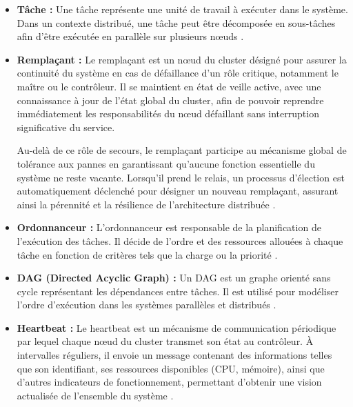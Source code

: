\documentclass[12pt,a4paper]{report}
\theoremstyle{definition}
\begin{document}
\begin{itemize}
Au-delà de la simple surveillance, le contrôleur joue un rôle clé dans la stabilité du système. Il déclenche les mécanismes de gestion des pannes, tels que la mise hors service d’un nœud défaillant ou l’initiation d’un processus d’élection pour remplacer un rôle critique \cite{bully}. Il garantit ainsi la cohérence, la fiabilité et la continuité du fonctionnement global du cluster.


    \item[$\bullet$] \textbf{Tâche :} Une tâche représente une unité de travail à exécuter dans le système. Dans un contexte distribué, une tâche peut être décomposée en sous-tâches afin d’être exécutée en parallèle sur plusieurs nœuds \cite{topcuoglu}.

    \item[$\bullet$] \textbf{Remplaçant :} Le remplaçant est un nœud du cluster désigné pour assurer la continuité du système en cas de défaillance d’un rôle critique, notamment le maître ou le contrôleur. Il se maintient en état de veille active, avec une connaissance à jour de l’état global du cluster, afin de pouvoir reprendre immédiatement les responsabilités du nœud défaillant sans interruption significative du service.

Au-delà de ce rôle de secours, le remplaçant participe au mécanisme global de tolérance aux pannes en garantissant qu’aucune fonction essentielle du système ne reste vacante. Lorsqu’il prend le relais, un processus d’élection est automatiquement déclenché pour désigner un nouveau remplaçant, assurant ainsi la pérennité et la résilience de l’architecture distribuée \cite{bully}.


    \item[$\bullet$] \textbf{Ordonnanceur :} L’ordonnanceur est responsable de la planification de l’exécution des tâches. Il décide de l’ordre et des ressources allouées à chaque tâche en fonction de critères tels que la charge ou la priorité \cite{topcuoglu}.

    \item[$\bullet$] \textbf{DAG (Directed Acyclic Graph) :} Un DAG est un graphe orienté sans cycle représentant les dépendances entre tâches. Il est utilisé pour modéliser l’ordre d’exécution dans les systèmes parallèles et distribués \cite{topcuoglu}.

    \item[$\bullet$] \textbf{Heartbeat :} Le heartbeat est un mécanisme de communication périodique par lequel chaque nœud du cluster transmet son état au contrôleur. À intervalles réguliers, il envoie un message contenant des informations telles que son identifiant, ses ressources disponibles (CPU, mémoire), ainsi que d’autres indicateurs de fonctionnement, permettant d’obtenir une vision actualisée de l’ensemble du système \cite{tanenbaum_ds, kubernetes}.


\end{itemize}
\end{document}
